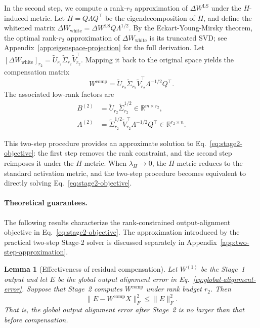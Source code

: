 \documentclass[a4paper,fleqn]{cas-dc}
\newtheorem{lemma}[theorem]{Lemma}
\begin{document}
In the second step, we compute a rank-$r_2$ approximation of $\Delta W^{\mathrm{LS}}$ under the $H$-induced metric. Let $H = Q\Lambda Q^\top$ be the eigendecomposition of $H$, and define the whitened matrix $\Delta W_{\mathrm{white}} = \Delta W^{\mathrm{LS}} Q\Lambda^{1/2}$. By the Eckart-Young-Mirsky theorem, the optimal rank-$r_2$ approximation of $\Delta W_{\mathrm{white}}$ is its truncated SVD; see Appendix~\ref{app:eigenspace-projection} for the full derivation. Let $[\Delta W_{\mathrm{white}}]_{r_2} = \tilde{U}_{r_2}\tilde{\Sigma}_{r_2}\tilde{V}_{r_2}^\top$. Mapping it back to the original space yields the compensation matrix
\begin{equation}
W^{\mathrm{comp}} = \tilde{U}_{r_2}\tilde{\Sigma}_{r_2}\tilde{V}_{r_2}^\top \Lambda^{-1/2}Q^\top.
\label{eq:stage2-compensation}
\end{equation}
The associated low-rank factors are
\begin{equation}
\begin{aligned}
B^{(2)} &= \tilde{U}_{r_2}\tilde{\Sigma}_{r_2}^{1/2} \in \mathbb{R}^{m \times r_2}, \\
A^{(2)} &= \tilde{\Sigma}_{r_2}^{1/2}\tilde{V}_{r_2}^\top \Lambda^{-1/2}Q^\top \in \mathbb{R}^{r_2 \times n}.
\end{aligned}
\label{eq:stage2-factors}
\end{equation}

This two-step procedure provides an approximate solution to Eq.~\eqref{eq:stage2-objective}: the first step removes the rank constraint, and the second step reimposes it under the $H$-metric. When $\lambda_H \to 0$, the $H$-metric reduces to the standard activation metric, and the two-step procedure becomes equivalent to directly solving Eq.~\eqref{eq:stage2-objective}.

\paragraph{Theoretical guarantees.}
The following results characterize the rank-constrained output-alignment objective in Eq.~\eqref{eq:stage2-objective}. The approximation introduced by the practical two-step Stage-2 solver is discussed separately in Appendix~\ref{app:two-step-approximation}.

\setcounter{theorem}{0}
\begin{lemma}[Effectiveness of residual compensation]\label{lem:residual}
Let $W^{(1)}$ be the Stage~1 output and let $E$ be the global output alignment error in Eq.~\eqref{eq:global-alignment-error}. Suppose that Stage~2 computes $W^{\mathrm{comp}}$ under rank budget $r_2$. Then
\begin{equation}
\|E - W^{\mathrm{comp}}X\|_F^2 \le \|E\|_F^2.
\label{eq:lemma-residual}
\end{equation}
That is, the global output alignment error after Stage~2 is no larger than that before compensation.
\end{lemma}
\end{document}
